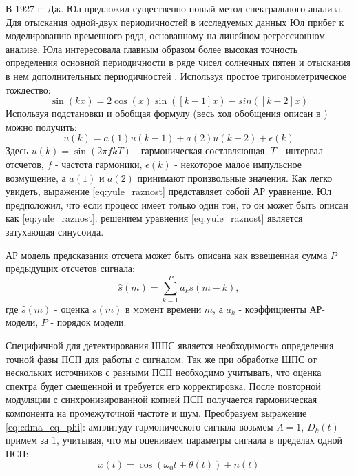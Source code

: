 В 1927 г. Дж. Юл предложил существенно новый метод спектрального анализа. Для отыскания одной-двух периодичностей в исследуемых данных Юл
прибег к моделированию временного ряда, основанному на линейном регрессионном анализе. Юла интересовала главным образом более высокая точность
определения основной периодичности в ряде чисел солнечных пятен и отыскания в нем дополнительных периодичностей \cite{marpl_book}.
Используя простое тригонометрическое тождество:
\begin{equation}
	\label{eq:yule_trigonometric}
	\sin(kx)=2\cos(x)\sin([k-1]x)-sin([k-2]x)
\end{equation}
Используя подстановки и обобщая формулу (весь ход обобщения описан в \cite{marpl_book}) можно получить:
\begin{equation}
	\label{eq:yule_raznost}
	u(k) = a(1)u(k-1) + a(2)u(k-2) + \epsilon (k)
\end{equation}
Здесь ${u(k) = \sin (2\pi fkT)}$ - гармоническая составляющая, ${T}$ - интервал отсчетов, ${f}$ - частота гармоники,
${\epsilon (k)}$ - некоторое малое импульсное возмущение, а ${a(1)}$ и ${a(2)}$ принимают произвольные значения.
Как легко увидеть, выражение \ref{eq:yule_raznost} представляет собой АР уравнение. Юл предположил, что
если процесс имеет только один тон, то он может быть описан как \ref{eq:yule_raznost}.
решением уравнения \ref{eq:yule_raznost} является затухающая синусоида.

АР модель предсказания отсчета может быть описана как взвешенная сумма ${P}$ предыдущих отсчетов сигнала:
\begin{equation}
	\label{eq:lpc_forecast}
	\hat{s}(m) = \sum \limits_{k=1}^P a_k s(m-k),
\end{equation}
где ${\hat{s}(m)}$ - оценка ${s(m)}$ в момент времени ${m}$, а ${a_k}$ - коэффициенты АР-модели, ${P}$ - порядок модели.

Специфичной для детектирования ШПС является необходимость определения точной фазы ПСП
для работы с сигналом. Так же при обработке ШПС от нескольких источников с разными ПСП необходимо учитывать,
что оценка спектра будет смещенной и требуется его корректировка. После повторной модуляции
с синхронизированной копией ПСП получается гармоническая компонента на промежуточной частоте и шум. 
Преобразуем выражение \ref{eq:cdma_eq_phi}: амплитуду гармонического
сигнала возьмем ${A = 1}$, ${D_k(t)}$ примем за 1, учитывая, что мы оцениваем параметры сигнала в пределах одной
ПСП:
\begin{equation}
	\label{eq:lpc_signal}
	x(t) = \cos(\omega_{0}t + \theta(t)) + n(t)
\end{equation}

